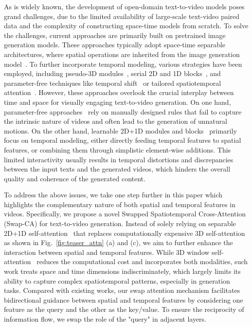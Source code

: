 \documentclass{article}
\begin{document}
As is widely known, the development of open-domain text-to-video models poses grand challenges, due to the limited availability of large-scale text-video paired data and the complexity of constructing space-time models from scratch. To solve the challenges, current approaches are primarily built on pretrained image generation models. These approaches typically adopt space-time separable architectures, where spatial operations are inherited from the image generation model~\cite{2022_VDM,2023CogVideo}. To further incorporate temporal modeling, various strategies have been employed, including pseudo-3D modules~\cite{MakeAVideo,zhou2022magicvideo}, serial 2D and 1D blocks~\cite{imagen}, and parameter-free techniques like temporal shift~\cite{2023LatentShift} or tailored spatiotemporal attention~\cite{wu2022tuneavideo}. 
However, these approaches overlook the crucial 
interplay between time and space for visually engaging text-to-video generation. On one hand, parameter-free approaches~\cite{2023LatentShift,wu2022tuneavideo} rely on manually designed rules that fail to capture the intrinsic nature of videos and often lead to the generation of unnatural motions. On the other hand,  learnable 2D+1D modules and blocks~\cite{VideoLDM, MakeAVideo,zhou2022magicvideo} primarily focus on temporal modeling, either directly feeding temporal features to spatial features, or combining them through simplistic element-wise additions. This limited interactivity usually results in temporal distortions and discrepancies between the input texts and the generated videos, which hinders the overall quality and coherence of the generated content.


To address the above issues, we take one step further in this paper which highlights the complementary nature of both spatial and temporal features in videos. Specifically, we propose a novel Swapped Spatiotemporal Cross-Attention  (Swap-CA) for text-to-video generation. 
Instead of solely relying on separable 2D+1D self-attention~\cite{2021_space_time_attn} that replaces computationally expensive 3D self-attention as shown in Fig.~\ref{fig:teaser_attn} (a) and (c), we aim to further enhance the interaction between spatial and temporal features. While 3D window self-attention~\cite{2022VideoSwin} reduces the computational cost and incorporates both modalities, such work treats space and time dimensions indiscriminately, which largely limits its ability to capture complex spatiotemporal patterns, especially in generation tasks.  Compared with existing works, our swap attention mechanism facilitates bidirectional guidance between spatial and temporal features by considering one feature as the query and the other as the key/value. To ensure the reciprocity of information flow, we swap the role of the "query" in adjacent layers.
\end{document}
